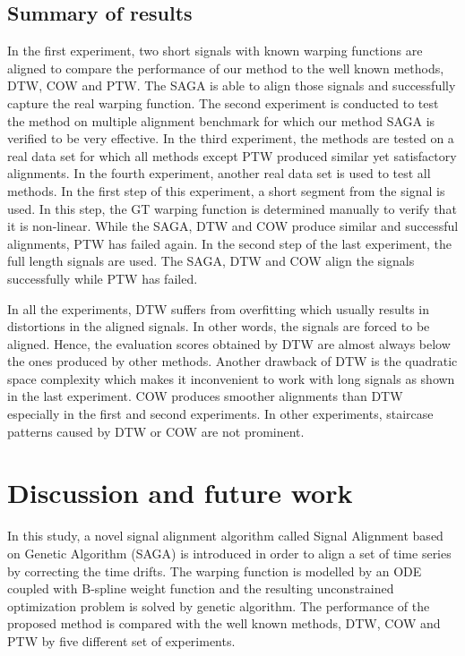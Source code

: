 \documentclass[number,1p,12pt]{elsarticle}
\begin{document}
\subsection{Summary of results}
In the first experiment, two short signals with known warping functions are aligned to compare the performance of our method to the well known methods, DTW, COW and PTW. The SAGA is able to align those signals and successfully capture the real warping function.  The second experiment is conducted to test the method on multiple alignment benchmark for which our method SAGA is verified to be very effective. In the third experiment, the methods are tested on a real data set for which all methods except PTW produced similar yet satisfactory alignments. In the fourth experiment, another real data set is used to test all methods. In the first step of this experiment, a short segment from the signal is used. In this step, the GT warping function is determined manually to verify that it is non-linear.  While the SAGA, DTW and COW produce similar and successful alignments, PTW has failed again. In the second step of the last experiment, the full length signals are used. The SAGA, DTW and COW align the signals successfully while PTW has failed.

In all the experiments, DTW suffers from overfitting which usually results in distortions in the aligned signals. In other words, the signals are forced to be aligned. Hence, the  evaluation scores obtained by DTW are almost always below the ones produced by other methods. Another drawback of DTW is the quadratic space complexity which makes it inconvenient to work with long signals as shown in the last experiment. COW produces smoother alignments than DTW especially in the first and second experiments. In other experiments, staircase patterns caused by DTW or COW are not prominent. 

\section{Discussion and future work}
In this study, a novel signal alignment algorithm called Signal Alignment based on Genetic Algorithm (SAGA) is introduced in order to align a set of time series by correcting the time drifts. The warping function is modelled by an ODE coupled with B-spline weight function and the resulting unconstrained optimization problem is solved by genetic algorithm. The performance of the proposed method is compared with the well known methods, DTW, COW and PTW by five different set of experiments. 
\end{document}
